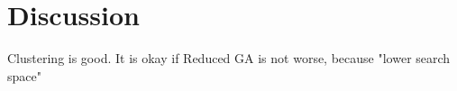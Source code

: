 \section{Discussion}
\label{sec:discussion}

Clustering is good. It is okay if Reduced GA is not worse, because
"lower search space"
